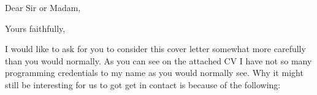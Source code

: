 \documentclass[11pt,a4paper,sans]{moderncv}        %
\begin{document}
\setcounter{page}{1}
 
\date{\today}
\opening{Dear Sir or Madam,}
\closing{Yours faithfully,}
\makelettertitle
\justify
I would like to ask for you to consider this cover letter somewhat more
carefully than you would normally. As you can see on the attached CV I have not
so many programming credentials to my name as you would normally see. Why it
might still be interesting for us to got get in contact is because of the
following:
\renewcommand{\labelitemi}{\textbullet}
\end{document}
